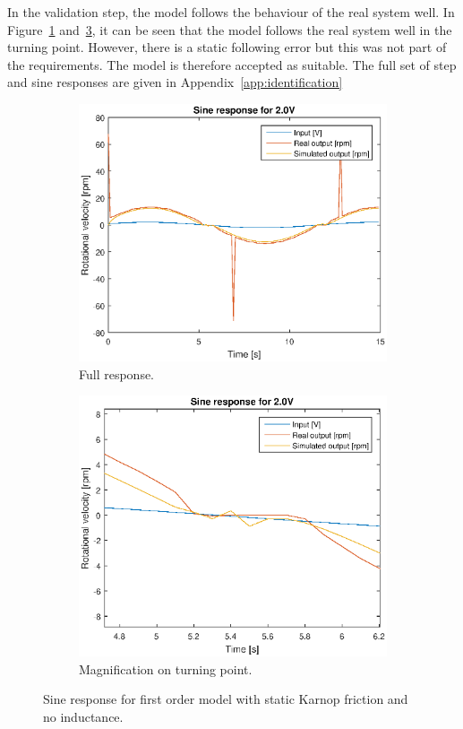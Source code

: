 In the validation step, the model follows the behaviour of the real system well.
In Figure~\ref{fig:1storder_f_sine2} and~\ref{fig:1storder_f_sine2z}, it can be
seen that the model follows the real system well in the turning point. However,
there is a static following error but this was not part of the requirements. The
model is therefore accepted as suitable. The full set of step and sine responses
are given in Appendix~\ref{app:identification}
\begin{figure}[H]
    \centering
    \begin{subfigure}[H]{0.48\textwidth}
    \label{fig:1storder_f_sine2}
    \includegraphics[width=\textwidth]{./img/testrig_2Vsine_no_i_fric.eps}
    \caption{Full response.}
    \end{subfigure}
    \begin{subfigure}[H]{0.48\textwidth}
    \label{fig:1storder_f_sine2z}
    \includegraphics[width=\textwidth]{./img/testrig_2Vsine_no_i_fric_zoom.eps}
    \caption{Magnification on turning point.}
    \end{subfigure}
    \caption{Sine response for first order model with static Karnop friction and 
    no inductance.}
\end{figure}

